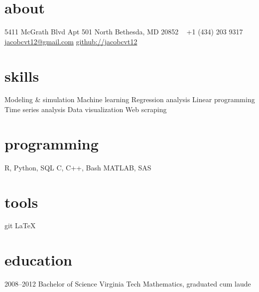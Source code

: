 \documentclass[]{friggeri-cv}
\begin{document}


\begin{aside} %
\section{about}
5411 McGrath Blvd
Apt 501
North Bethesda, MD 20852
~
+1 (434) 203 9317
~
\href{mailto:jacobcvt12@gmail.com}{jacobcvt12@gmail.com}
\href{https://github.com/jacobicvt12}{github://jacobcvt12}
\section{skills}
Modeling \& simulation
Machine learning
Regression analysis
Linear programming
Time series analysis
Data visualization
Web scraping
\section{programming}
R, Python, SQL
C, C++, Bash
MATLAB, SAS
\section{tools}
git
\LaTeX
\end{aside}


\section{education}

\begin{entrylist}
\entry
{2008--2012}
{Bachelor {\normalfont of Science}}
{Virginia Tech}
{Mathematics, graduated cum laude}
\end{entrylist}

\end{document}
